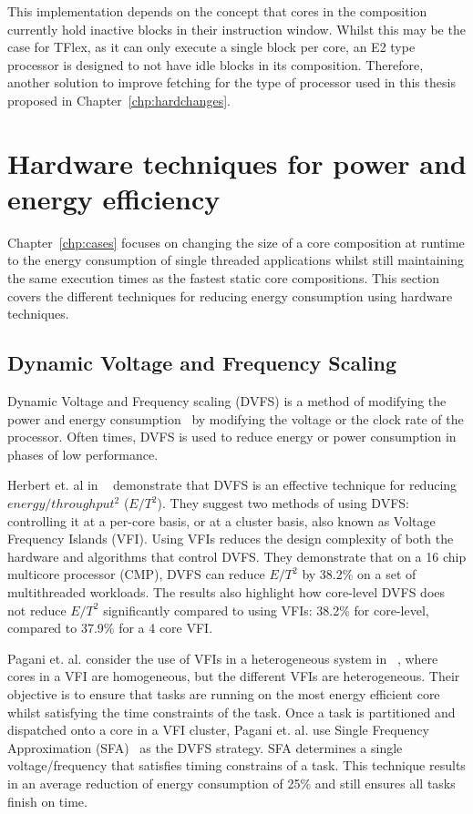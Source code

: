 This implementation depends on the concept that cores in the composition currently hold inactive blocks in their instruction window.
Whilst this may be the case for TFlex, as it can only execute a single block per core, an E2 type processor is designed to not have idle blocks in its composition.
Therefore, another solution to improve fetching for the type of processor used in this thesis proposed in Chapter~\ref{chp:hardchanges}.

\vspace{-1em}
\section{Hardware techniques for power and energy efficiency}

Chapter~\ref{chp:cases} focuses on changing the size of a core composition at runtime to the energy consumption of single threaded applications whilst still maintaining the same execution times as the fastest static core compositions.
This section covers the different techniques for reducing energy consumption using hardware techniques.

\subsection{Dynamic Voltage and Frequency Scaling}
Dynamic Voltage and Frequency scaling (DVFS) is a method of modifying the power and energy consumption~\cite{paganiEECHM2017} by modifying the voltage or the clock rate of the processor.
Often times, DVFS is used to reduce energy or power consumption in phases of low performance.

Herbert et. al in ~\cite{herbertDVFS07} demonstrate that DVFS is an effective technique for reducing $energy/throughput^2$ ($E/T^2$).
They suggest two methods of using DVFS: controlling it at a per-core basis, or at a cluster basis, also known as Voltage Frequency Islands (VFI).
Using VFIs reduces the design complexity of both the hardware and algorithms that control DVFS.
They demonstrate that on a 16 chip multicore processor (CMP), DVFS can reduce $E/T^2$ by 38.2\% on a set of multithreaded workloads.
The results also highlight how core-level DVFS does not reduce $E/T^2$ significantly compared to using VFIs: 38.2\% for core-level, compared to 37.9\% for a 4 core VFI.

Pagani et. al. consider the use of VFIs in a heterogeneous system in ~\cite{paganiEECHM2017}, where cores in a VFI are homogeneous, but the different VFIs are heterogeneous.
Their objective is to ensure that tasks are running on the most energy efficient core whilst satisfying the time constraints of the task.
Once a task is partitioned and dispatched onto a core in a VFI cluster, Pagani et. al. use Single Frequency Approximation (SFA)~\cite{sfaScheme} as the DVFS strategy.
SFA determines a single voltage/frequency that satisfies timing constrains of a task.
This technique results in an average reduction of energy consumption of 25\% and still ensures all tasks finish on time.


